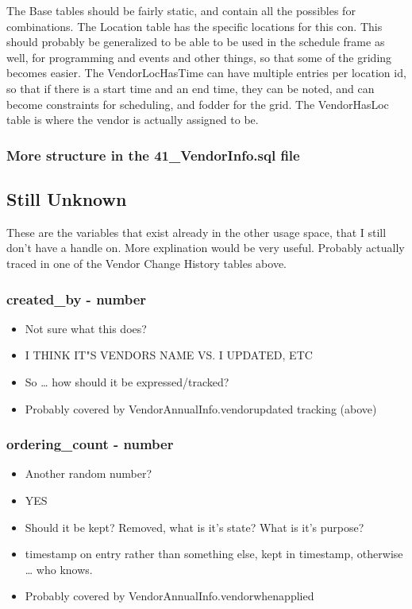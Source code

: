 \documentclass[captions=tablesignature]{scrartcl}
\begin{document}
The Base tables should be fairly static, and contain all the
possibles for combinations.
The Location table has the specific locations for this con.  This 
should probably be generalized to be able to be used in the
schedule frame as well, for programming and events and other
things, so that some of the griding becomes easier.
The VendorLocHasTime can have multiple entries per location id,
so that if there is a start time and an end time, they can be
noted, and can become constraints for scheduling, and fodder for
the grid.
The VendorHasLoc table is where the vendor is actually assigned
to be.

\subsubsection{More structure in the 41\_VendorInfo.sql file}
\label{sec-2-5-15}

\subsection{Still Unknown}
\label{sec-2-6}
These are the variables that exist already in the other usage
space, that I still don't have a handle on.  More explination would
be very useful.  Probably actually traced in one of the Vendor
Change History tables above.
\subsubsection{created\_by - number}
\label{sec-2-6-1}
\begin{itemize}
\item Not sure what this does?
\item I THINK IT"S VENDORS NAME VS. I UPDATED, ETC
\item So \ldots{} how should it be expressed/tracked?
\item Probably covered by VendorAnnualInfo.vendorupdated tracking (above)
\end{itemize}

\subsubsection{ordering\_count - number}
\label{sec-2-6-2}
\begin{itemize}
\item Another random number?
\item YES
\item Should it be kept?  Removed, what is it's state?  What is it's
purpose?
\item timestamp on entry rather than something else, kept in
timestamp, otherwise \ldots{} who knows.
\item Probably covered by VendorAnnualInfo.vendorwhenapplied
\end{itemize}
\end{document}
